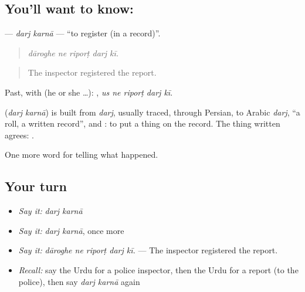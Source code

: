 \subsection*{You'll want to know:  }
\textbf{ } — \emph{darj karnā} — \textquotedblleft{}to register (in a record)\textquotedblright{}.

\begin{quote}
    
\end{quote}

\begin{quote}
\emph{dāroghe ne riporṭ darj kī.}
\end{quote}

\begin{quote}
The inspector registered the report.
\end{quote}

Past, with  (he or she …):     , \emph{us ne riporṭ darj kī}.

\begin{cousinweb}
\textbf{ } (\emph{darj karnā}) is built from \emph{darj}, usually traced, through Persian, to Arabic \emph{darj}, \textquotedblleft{}a roll, a written record\textquotedblright{}, and \textbf{}: to put a thing on the record. The thing written agrees: \textbf{  }.
\end{cousinweb}

\begin{grammarlens}[title={What you've built}]
One more word for telling what happened.
\end{grammarlens}

\subsection*{Your turn}
\begin{itemize}
\raggedright
  \item \emph{Say it:} \emph{darj karnā}
  \item \emph{Say it:} \emph{darj karnā}, once more
  \item \emph{Say it:} \emph{dāroghe ne riporṭ darj kī.} — The inspector registered the report.
  \item \emph{Recall:} say the Urdu for a police inspector, then the Urdu for a report (to the police), then say \emph{darj karnā} again
\end{itemize}

